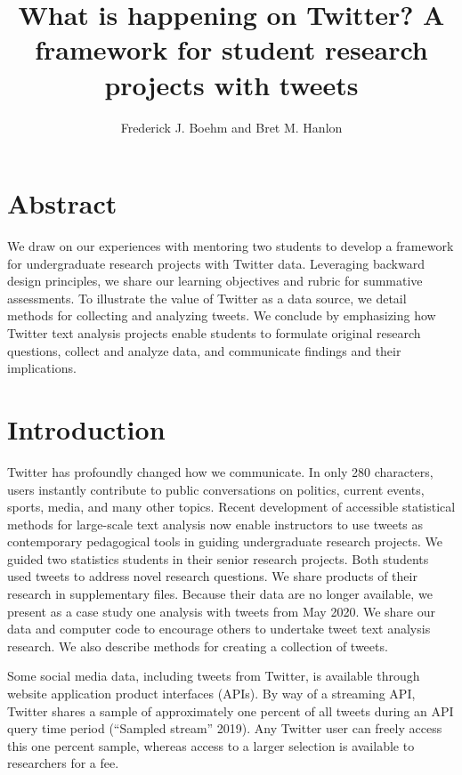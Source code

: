 \documentclass[
]{article}
\title{What is happening on Twitter? A framework for student research projects with tweets}
\author{Frederick J. Boehm and Bret M. Hanlon}
\date{}
\begin{document}
\maketitle

\hypertarget{abstract}{%
\section{Abstract}\label{abstract}}

We draw on our experiences with mentoring two students to develop a framework for undergraduate research projects with Twitter data.
Leveraging backward design principles, we share our learning objectives and
rubric for summative assessments. To illustrate the value of Twitter as a data source,
we detail methods for collecting and analyzing tweets. We conclude by emphasizing
how Twitter text analysis projects enable students to formulate
original research questions, collect and analyze data, and communicate
findings and their implications.

\hypertarget{introduction}{%
\section{Introduction}\label{introduction}}

Twitter has profoundly changed how we communicate.
In only 280 characters, users instantly contribute to public conversations on politics,
current events, sports, media, and many other topics.
Recent development of accessible statistical methods for large-scale text
analysis now enable instructors to use tweets as contemporary pedagogical
tools in guiding undergraduate research projects.
We guided two statistics students in their senior research projects.
Both students used tweets to address novel research questions. We
share products of their research in supplementary files. Because
their data are no longer available, we present as a case study one
analysis with tweets from May 2020. We share our data and computer
code to encourage others to undertake
tweet text analysis research. We also describe methods for creating a
collection of tweets.

Some social media data, including tweets from Twitter, is
available through website application product interfaces (APIs).
By way of a streaming API, Twitter shares a sample of approximately
one percent of all
tweets during an API query time period (``Sampled stream'' 2019). Any Twitter
user can freely
access this one percent sample, whereas access to a larger selection is available to
researchers for a fee.
\end{document}

